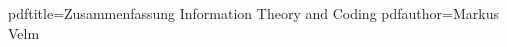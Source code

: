 \newcommand*{\titel}{Zusammenfassung Information Theory and Coding}
\newcommand*{\autor}{Markus Velm}

\hypersetup
{
	pdftitle=\titel
	pdfauthor=\autor
}
